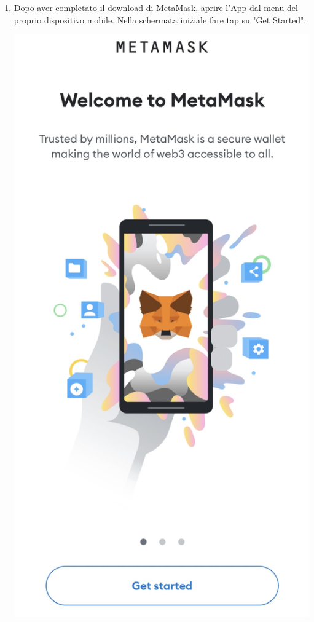 \begin{enumerate}
    \item Dopo aver completato il download di MetaMask, aprire l'App dal menu del proprio dispositivo mobile. Nella schermata iniziale fare tap su "Get Started".
     \begin{center}
        \includegraphics[scale = 0.1]{img/metamask_mobile_store2.jpg}
    \end{center}
    

\end{enumerate}
